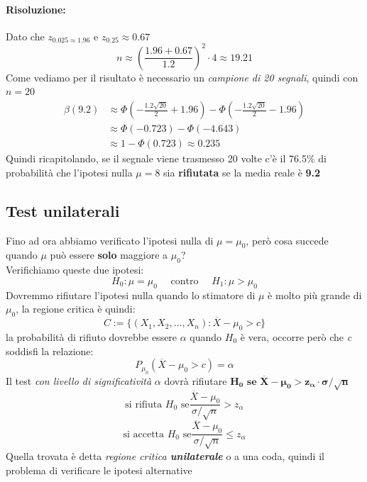 \documentclass[]{article}
\begin{document}
    \paragraph{Risoluzione:} Dato che $z_{0.025 \approx 1.96}$ e $z_{0.25} \boldsymbol{\approx 0.67}$ 
    \[ n \approx \left( \frac{1.96 + 0.67}{1.2} \right)^2 \cdot 4 \approx 19.21 \]
    Come vediamo per il risultato è necessario un \textit{campione di 20 segnali}, quindi con $n=20$
    \begin{equation*}
        \begin{split}
            \beta(9.2) &\approx \Phi \left( - \frac{1.2 \sqrt{20}}{2} + 1.96 \right) - \Phi \left( - \frac{1.2 \sqrt{20}}{2} - 1.96 \right) \\
            &\approx \Phi(-0.723) - \Phi(-4.643) \\
            &\approx 1 - \Phi(0.723) \approx \boldsymbol{0.235}
        \end{split}
    \end{equation*}
    Quindi ricapitolando, se il segnale viene trasmesso 20 volte c'è il 76.5\% di probabilità che l'ipotesi nulla $\mu = 8$ sia \textbf{rifiutata} se la media reale è \textbf{9.2}

    \subsection{Test unilaterali}
    Fino ad ora abbiamo verificato l'ipotesi nulla di $\mu = \mu_0$, però cosa succede quando $\mu$ può essere \textbf{solo} maggiore a $\mu_0$? \\
    Verifichiamo queste due ipotesi:
    \[ H_0 : \mu = \mu_0 \quad \text{ contro } \quad H_1 : \mu > \mu_0 \]
    Dovremmo rifiutare l'ipotesi nulla quando lo stimatore di $\mu$ è molto più grande di $\mu_0$, la regione critica è quindi:
    \[ C := \{ (X_1, X_2, \ldots, X_n) : \overline{X} - \mu_0 > c \} \]
    la probabilità di rifiuto dovrebbe essere $\alpha$ quando $H_0$ è vera, occorre però che \textit{c} soddisfi la relazione:
    \[ P_{\mu_0} (\overline{X} - \mu_0 > c) = \alpha \]
    Il test \textit{con livello di significatività} $\alpha$ dovrà rifiutare $\boldsymbol{H_0 \text{ se } \overline{X} - \mu_0 > z_\alpha \cdot \sigma / \sqrt{n}}$
    \[ \text{si rifiuta } H_0 \text{ se} \frac{\overline{X} - \mu_0}{\sigma / \sqrt{n}} > z_\alpha \]
    \[ \text{si accetta } H_0 \text{ se} \frac{\overline{X} - \mu_0}{\sigma / \sqrt{n}} \leq z_\alpha \]
    Quella trovata è detta \textit{regione critica \textbf{unilaterale}} o a una coda, quindi il problema di verificare le ipotesi alternative
\end{document}
